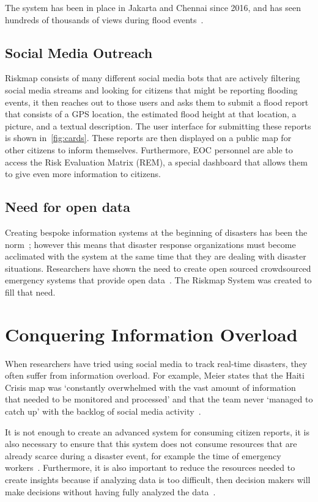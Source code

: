   The system has been in place in Jakarta and Chennai since 2016, and has
  seen hundreds of thousands of views during flood
  events~\cite{noveckOpinionElectionsWon2018, oct31ChennaiGetsRain}.

  \subsection{Social Media Outreach}
  Riskmap consists of many different social media bots that are actively
  filtering social media streams and looking for citizens that might be
  reporting flooding events, it then reaches out to those users and asks
  them to submit a flood report that consists of a GPS location, the
  estimated flood height at that location, a picture, and a textual
  description. The user interface for submitting these reports is shown
  in~\ref{fig:cards}. These reports are then displayed on a public map for other
  citizens to inform themselves. Furthermore, EOC personnel are able to
  access the Risk Evaluation Matrix (REM), a special dashboard that allows
  them to give even more information to citizens.

  \subsection{Need for open data} Creating bespoke information systems at
  the beginning of disasters has been the
  norm~\cite{aminDataNaturalDisasters2008}; however this means that disaster
  response organizations must become acclimated with the system at the same time
  that they are dealing with disaster situations.  Researchers have shown the
  need to create open sourced crowdsourced emergency systems that provide open
  data~\cite{avvenutiNeedOpeningCrowdsourced2018a}. The Riskmap System was
  created to fill that need.
  
\section{Conquering Information Overload} 
  When researchers have tried using social media to track real-time disasters,
  they often suffer from information overload. For example, Meier states that
  the Haiti Crisis map was `constantly overwhelmed with the vast amount of
  information that needed to be monitored and processed' and that the team never
  `managed to catch up' with the backlog of social media
  activity~\cite{meierDigitalHumanitariansHow2015}.
  
  It is not enough to create an advanced system for consuming citizen reports,
  it is also necessary to ensure that this system does not consume resources
  that are already scarce during a disaster event, for example the time of
  emergency workers~\cite{aminDataNaturalDisasters2008}. Furthermore, it is also
  important to reduce the resources needed to create insights because if
  analyzing data is too difficult, then decision makers will make decisions
  without having fully analyzed the
  data~\cite{quarantelliUrbanVulnerabilityDisasters2003}.
  
